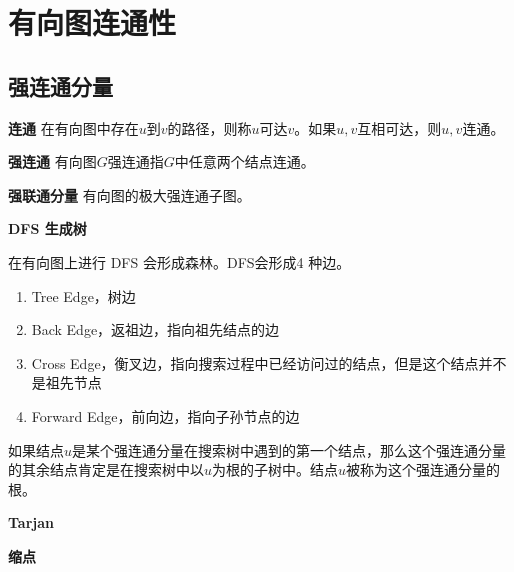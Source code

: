 \section{有向图连通性}
\subsection{强连通分量}
\textbf{连通} 在有向图中存在$u$到$v$的路径，则称$u$可达$v$。如果$u,v$互相可达，则$u,v$连通。

\textbf{强连通} 有向图$G$强连通指$G$中任意两个结点连通。

\textbf{强联通分量} 有向图的极大强连通子图。

\textbf{DFS 生成树}

在有向图上进行 DFS 会形成森林。DFS会形成4 种边。
\begin{enumerate}
    \item Tree Edge，树边
    \item Back Edge，返祖边，指向祖先结点的边
    \item Cross Edge，衡叉边，指向搜索过程中已经访问过的结点，但是这个结点并不是祖先节点
    \item Forward Edge，前向边，指向子孙节点的边
\end{enumerate}

如果结点$u$是某个强连通分量在搜索树中遇到的第一个结点，那么这个强连通分量的其余结点肯定是在搜索树中以$u$为根的子树中。结点$u$被称为这个强连通分量的根。

\textbf{Tarjan}



\textbf{缩点}

